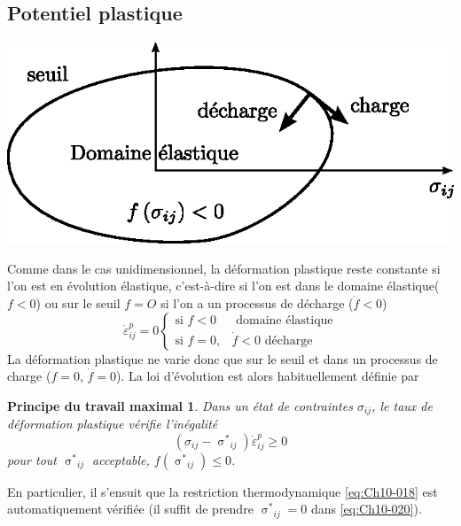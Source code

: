 \subsection{Potentiel plastique} \label{ssec:Ch10-1.3}
\begin{center}
    \includegraphics{../images/T1_Ch10-08}
\end{center}
Comme dans le cas unidimensionnel, la déformation plastique reste constante si l'on est en évolution élastique, c'est-à-dire si l'on est dans le domaine élastique($f<0$) ou sur le seuil $f=O$ si l'on a un processus de décharge ($\dot{f} < 0$) 
\begin{equation}
    \dot{\varepsilon}_{ij}^p = 0
    \begin{cases}
        \text{si } f < 0 & \text{ domaine élastique} \\
        \text{si } f = 0, & \dot{f}<0 \text{ décharge}
    \end{cases}
    \label{eq:Ch10-019}
\end{equation}
La déformation plastique ne varie donc que sur le seuil et dans un processus de charge ($f=0$, $\dot{f}=0$).
La loi d'évolution est alors habituellement définie par 
\newtheorem*{PTM}{Principe du travail maximal}
\begin{PTM}
    Dans un état de contraintes $\sigma_{ij}$, le taux de 
déformation plastique vérifie l'inégalité 
    \begin{equation}
        \left( \sigma_{ij} - {\mathop{\sigma}^{\ast}}_{ij} \right) \dot{\varepsilon}_{ij}^p \geq 0
        \label{eq:Ch10-020}
    \end{equation}
    pour tout $\displaystyle {\mathop{\sigma}^{\ast}}_{ij}$ acceptable, $\displaystyle f\left( {\mathop{\sigma}^{\ast}}_{ij} \right) \leq 0$.
\end{PTM}

En particulier, il s'ensuit que la restriction thermodynamique \eqref{eq:Ch10-018} est automatiquement vérifiée (il suffit de prendre $\displaystyle {\mathop{\sigma}^{\ast}}_{ij}=0$ dans \eqref{eq:Ch10-020}). 

